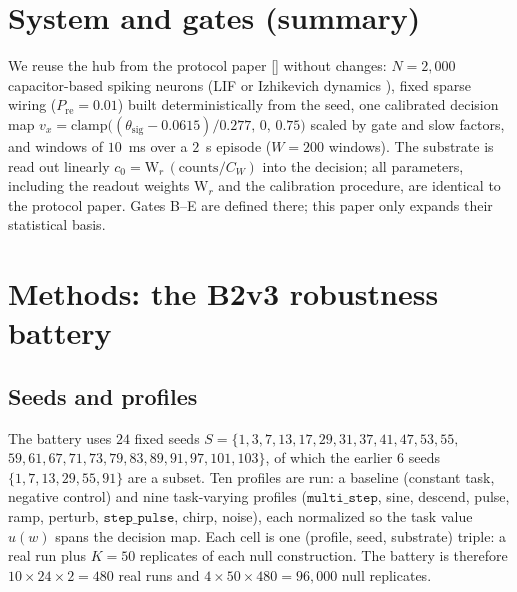 \documentclass[journal]{IEEEtran}
\begin{document}
\section{System and gates (summary)}

We reuse the hub from the protocol paper [\cite{b1}] without changes: $N=2{,}000$
capacitor-based spiking neurons (LIF or Izhikevich dynamics
\cite{izhikevich2003,gerstner2014}), fixed sparse wiring ($P_{\mathrm{re}}=0.01$)
built deterministically from the seed, one calibrated decision map
$v_x=\mathrm{clamp}\big((\theta_{\mathrm{sig}}-0.0615)/0.277,\,0,\,0.75\big)$
scaled by gate and slow factors, and windows of $10$~ms over a $2$~s episode
($W=200$ windows). The substrate is read out linearly
$c_0=\mathrm{W}_r\,(\mathrm{counts}/C_W)$ into the decision; all parameters,
including the readout weights $\mathrm{W}_r$ and the calibration procedure, are
identical to the protocol paper. Gates B--E are defined there; this paper only
expands their statistical basis.

\section{Methods: the B2v3 robustness battery}

\subsection{Seeds and profiles}
The battery uses $24$ fixed seeds
$S=\{1,3,7,13,17,29,31,37,41,47,53,55,$
$59,61,67,71,73,79,83,89,91,97,101,103\}$,
of which the earlier $6$ seeds $\{1,7,13,29,55,91\}$ are a subset. Ten profiles
are run: a baseline (constant task, negative control) and nine task-varying
profiles ($\texttt{multi\_step}$, sine, descend, pulse, ramp, perturb,
$\texttt{step\_pulse}$, chirp, noise), each normalized so the task value $u(w)$
spans the decision map. Each cell is one (profile, seed, substrate) triple: a real
run plus $K=50$ replicates of each null construction. The battery is therefore
$10\times24\times2=480$ real runs and $4\times50\times480=96{,}000$ null
replicates.
\end{document}
